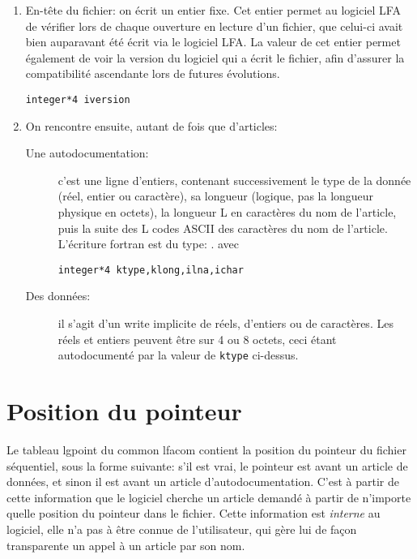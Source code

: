 \documentclass[10pt,french]{book}
\begin{document}
\begin{enumerate}
	\item En-tête du fichier: on écrit un entier fixe. Cet entier
		permet au logiciel LFA de vérifier lors de chaque
		ouverture en lecture d'un fichier,
		que celui-ci avait bien auparavant été écrit
		via le logiciel LFA. La valeur
		de cet entier permet également de voir la version
		du logiciel qui a écrit le fichier, afin
		d'assurer la compatibilité ascendante lors
		de futures évolutions.

		\begin{verbatim}
integer*4 iversion
		\end{verbatim}
	\item On rencontre ensuite, autant de fois que d'articles:
		\begin{description}
		    \item [Une autodocumentation:] c'est une ligne d'entiers,
		    	contenant successivement le type de la donnée
			(réel, entier ou caractère), sa longueur
			(logique, pas la longueur physique en octets),
			la longueur L en caractères du nom de l'article,
			puis la suite des L codes ASCII des caractères
			du nom de l'article.
			L'écriture fortran est du type: 
			.
			avec
		\begin{verbatim}
integer*4 ktype,klong,ilna,ichar
		\end{verbatim}
		    \item [Des données:] il s'agit d'un write implicite de 
		    	réels, d'entiers ou de caractères. Les réels et entiers
			peuvent être sur 4 ou 8 octets, ceci étant
			autodocumenté par la valeur de {\tt ktype} ci-dessus.
		\end{description}
\end{enumerate}

\section{Position du pointeur}

\p Le tableau lgpoint du common lfacom contient la position du pointeur
du  fichier  séquentiel,  sous  la  forme  suivante:  s'il  est vrai, le
pointeur  est  avant  un  article  de  données, et sinon il est avant un
article  d'autodocumentation. C'est à partir de cette information que le
logiciel  cherche  un  article  demandé  à  partir  de  n'importe quelle
position du pointeur dans le fichier. Cette information est {\em interne}
au logiciel, elle n'a pas à être connue de l'utilisateur,
qui gère lui de façon transparente un appel à un article par son nom.
\end{document}
